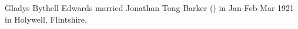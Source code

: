 
Gladys Bythell Edwards married Jonathan Tong Barker () in Jan-Feb-Mar 1921 in Holywell, Flintshire.\cite{GBEMarriage}

